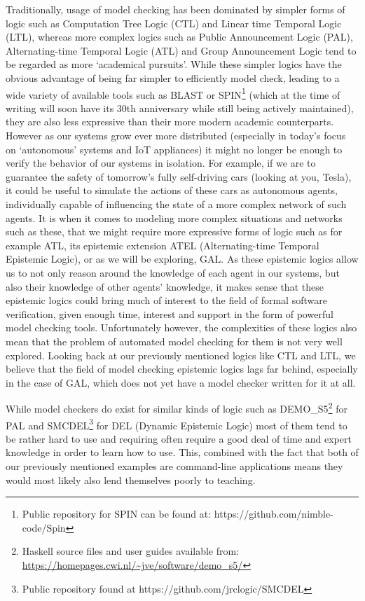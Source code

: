 Traditionally, usage of model checking has been dominated by simpler forms of logic such as Computation Tree Logic (CTL) and Linear time Temporal Logic (LTL), whereas more complex logics such as Public Announcement Logic (PAL), Alternating-time Temporal Logic (ATL) and Group Announcement Logic tend to be regarded as more `academical pursuits'. While these simpler logics have the obvious advantage of being far simpler to efficiently model check, leading to a wide variety of available tools such as BLAST or SPIN\footnote{Public repository for SPIN can be found at: https://github.com/nimble-code/Spin} (which at the time of writing will soon have its 30th anniversary while still being actively maintained), they are also less expressive than their more modern academic counterparts. However as our systems grow ever more distributed (especially in today's focus on `autonomous' systems and IoT appliances) it might no longer be enough to verify the behavior of our systems in isolation. For example, if we are to guarantee the safety of tomorrow's fully self-driving cars (looking at you, Tesla), it could be useful to simulate the actions of these cars as autonomous agents, individually capable of influencing the state of a more complex network of such agents. It is when it comes to modeling more complex situations and networks such as these, that we might require more expressive forms of logic such as for example ATL, its epistemic extension ATEL (Alternating-time Temporal Epistemic Logic), or as we will be exploring, GAL. As these epistemic logics allow us to not only reason around the knowledge of each agent in our systems, but also their knowledge of other agents' knowledge, it makes sense that these epistemic logics could bring much of interest to the field of formal software verification, given enough time, interest and support in the form of powerful model checking tools. Unfortunately however, the complexities of these logics also mean that the problem of automated model checking for them is not very well explored. Looking back at our previously mentioned logics like CTL and LTL, we believe that the field of model checking epistemic logics lags far behind, especially in the case of GAL, which does not yet have a model checker written for it at all. 

While model checkers do exist for similar kinds of logic such as DEMO\_S5\footnote{Haskell source files and user guides available from: \url{https://homepages.cwi.nl/~jve/software/demo_s5/}} for PAL and SMCDEL\footnote{Public repository found at https://github.com/jrclogic/SMCDEL} for DEL (Dynamic Epistemic Logic) most of them tend to be rather hard to use and requiring often require a good deal of time and expert knowledge in order to learn how to use. This, combined with the fact that both of our previously mentioned examples are command-line applications means they would most likely also lend themselves poorly to teaching. 

